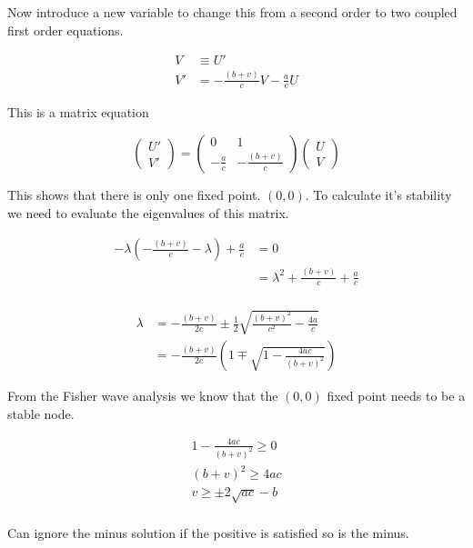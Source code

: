 \documentclass[a4paper]{article}
\begin{document}
Now introduce a new variable to change this from a second order to two coupled first order equations. 

\begin{align*}
V & \equiv U' \\
V ' & = - \frac{(b+v)}{c} V - \frac{a}{c} U
\end{align*}

This is a matrix equation 

\begin{equation}
\begin{pmatrix}
U ' \\
V '
\end{pmatrix}  = 
\begin{pmatrix}
0 & 1 \\
- \frac{a}{c} & - \frac{(b+v)}{c}
\end{pmatrix}
\begin{pmatrix}
U \\ 
V
\end{pmatrix}
\end{equation}

This shows that there is only one fixed point. $(0,0)$. To calculate it's stability we need to evaluate the eigenvalues of this matrix. 

\begin{align*}
- \lambda \left( - \frac{(b+v)}{c} - \lambda \right) + \frac{a}{c} & = 0 \\
& = \lambda ^2 + \frac{(b+v)}{c} + \frac{a}{c} \\
\end{align*}

\begin{align*}
\lambda & = - \frac{(b+v)}{2c} \pm \frac{1}{2} \sqrt{\frac{(b+v)^2}{c^2} - \frac{4a}{c}} \\
& = - \frac{(b+v)}{2c} \left( 1 \mp \sqrt{1 - \frac{4ac}{(b+v)^2}} \right)
\end{align*}

From the Fisher wave analysis we know that the $(0,0)$ fixed point needs to be a  stable node. 

\begin{align*}
1 - \frac{4ac}{(b+v)^2} \geq 0 \\
(b+v)^2 \geq 4ac \\
v \geq \pm 2 \sqrt{ac} - b \\
\end{align*}

Can ignore the minus solution if the positive is satisfied so is the minus. 
\end{document}
